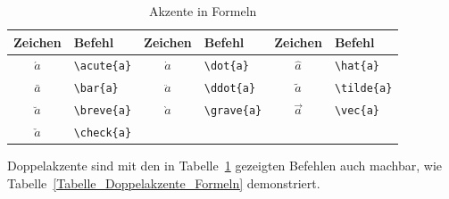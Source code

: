 \documentclass[a4paper,10pt,twoside]{scrbook}
\begin{document}
{\begin{table}[h!tb]
\centering
\caption{Akzente in Formeln}
\label{Tabelle_Akzente_Formeln}       %
\begin{tabular}{clclcl}
\hline
Zeichen & Befehl & Zeichen & Befehl & Zeichen & Befehl \\
\hline
$\acute{a}$ & \texttt{\textbackslash acute\{a\}} & 
$\dot{a}$ & \texttt{\textbackslash dot\{a\}} &
$\hat{a}$ & \texttt{\textbackslash hat\{a\}} \\
$\bar{a}$ & \texttt{\textbackslash bar\{a\}} &
$\ddot{a}$ & \texttt{\textbackslash ddot\{a\}} &
$\tilde{a}$ & \texttt{\textbackslash tilde\{a\}} \\
$\breve{a}$ & \texttt{\textbackslash breve\{a\}} &
$\grave{a}$ & \texttt{\textbackslash grave\{a\}} &
$\vec{a}$ & \texttt{\textbackslash vec\{a\}} \\
$\check{a}$ & \texttt{\textbackslash check\{a\}} &
  & \\
\hline
\end{tabular}
\end{table}

Doppelakzente sind mit den in Tabelle~\ref{Tabelle_Akzente_Formeln} gezeigten
Befehlen auch machbar, wie Tabelle~\ref{Tabelle_Doppelakzente_Formeln} demonstriert.


}
\end{document}
